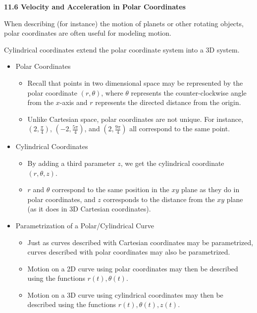 \documentclass[12pt]{article}
\theoremstyle{plain}
\theoremstyle{definition}
\theoremstyle{remark}
\begin{document}
	\newpage
	
	\centerline{\bf 11.6 Velocity and Acceleration in Polar Coordinates}
	
	When describing (for instance) the motion of planets or other rotating objects, polar coordinates are often useful for modeling motion.
	
	Cylindrical coordinates extend the polar coordinate system into a 3D system.
	
	\begin{itemize}
	
	\item Polar Coordinates
	
		\begin{itemize}
		\item Recall that points in two dimensional space may be represented by the polar coordinate $(r,\theta)$, where $\theta$ represents the counter-clockwise angle from the $x$-axis and $r$ represents the directed distance from the origin.
		\item Unlike Cartesian space, polar coordinates are not unique. For instance, $(2,\frac{\pi}{4})$, $(-2,\frac{5\pi}{4})$, and $(2,\frac{9\pi}{4})$ all correspond to the same point.
		\end{itemize}
		
	\item Cylindrical Coordinates
	
		\begin{itemize}
		\item By adding a third parameter $z$, we get the cylindrical coordinate $(r,\theta,z)$.
		\item $r$ and $\theta$ correspond to the same position in the $xy$ plane as they do in polar coordinates, and $z$ corresponds to the distance from the $xy$ plane (as it does in 3D Cartesian coordinates).
		\end{itemize}
		
	\item Parametrization of a Polar/Cylindrical Curve
	
		\begin{itemize}
		\item Just as curves described with Cartesian coordinates may be parametrized, curves described with polar coordinates may also be parametrized.
		\item Motion on a 2D curve using polar coordinates may then be described using the functions $r(t),\theta(t)$.
		\item Motion on a 3D curve using cylindrical coordinates may then be described using the functions $r(t),\theta(t),z(t)$.
		\end{itemize}
		

\end{itemize}
\end{document}

